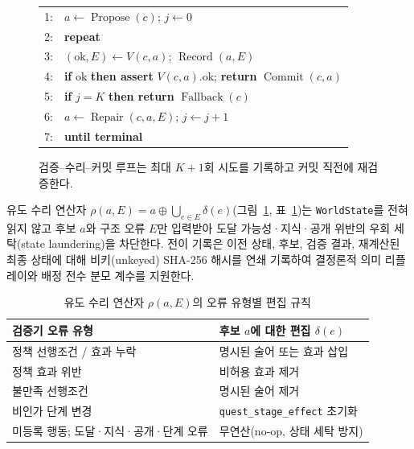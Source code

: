 \begin{figure}[!tbp]
\centering
\footnotesize
\begin{tabular}{@{}rl@{}}
1: & $a\leftarrow\operatorname{Propose}(c)$; $j\leftarrow0$ \\
2: & \textbf{repeat} \\
3: & \quad $(\mathrm{ok},E)\leftarrow V(c,a)$; $\operatorname{Record}(a,E)$ \\
4: & \quad \textbf{if} $\mathrm{ok}$ \textbf{then assert} $V(c,a).\mathrm{ok}$; \textbf{return} $\operatorname{Commit}(c,a)$ \\
5: & \quad \textbf{if} $j=K$ \textbf{then return} $\operatorname{Fallback}(c)$ \\
6: & \quad $a\leftarrow\operatorname{Repair}(c,a,E)$; $j\leftarrow j+1$ \\
7: & \textbf{until terminal}
\end{tabular}
\caption{검증--수리--커밋 루프는 최대 $K+1$회 시도를 기록하고 커밋 직전에 재검증한다.}
\label{alg:commit}
\end{figure}

유도 수리 연산자 $\rho(a,E)=a\oplus\bigcup_{e\in E}\delta(e)$(그림~\ref{alg:commit}, 표~\ref{tab:rho-rules})는 \texttt{WorldState}를 전혀 읽지 않고 후보 $a$와 구조 오류 $E$만 입력받아 도달 가능성·지식·공개 위반의 우회 세탁(state laundering)을 차단한다. 전이 기록은 이전 상태, 후보, 검증 결과, 재계산된 최종 상태에 대해 비키(unkeyed) SHA-256 해시를 연쇄 기록하여 결정론적 의미 리플레이와 배정 전수 분모 계수를 지원한다.

\begin{table}[!tbp]
\caption{유도 수리 연산자 $\rho(a,E)$의 오류 유형별 편집 규칙}
\label{tab:rho-rules}
\centering
\footnotesize
\begin{tabularx}{\columnwidth}{@{}>{\raggedright\arraybackslash}X>{\raggedright\arraybackslash}X@{}}
\toprule
\textbf{검증기 오류 유형} & \textbf{후보 $a$에 대한 편집 $\delta(e)$} \\
\midrule
정책 선행조건 / 효과 누락 & 명시된 술어 또는 효과 삽입 \\
정책 효과 위반 & 비허용 효과 제거 \\
불만족 선행조건 & 명시된 술어 제거 \\
비인가 단계 변경 & \texttt{quest\_stage\_effect} 초기화 \\
미등록 행동; 도달·지식·공개·단계 오류 & 무연산(no-op, 상태 세탁 방지) \\
\bottomrule
\end{tabularx}
\end{table}
